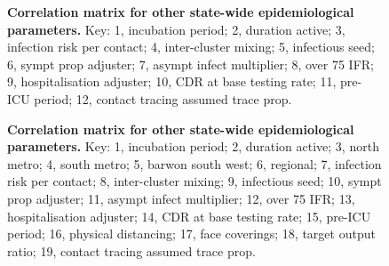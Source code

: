 \begin{figure}[ht]
    \caption{\textbf{Correlation matrix for other state-wide epidemiological parameters.} Key: 1, incubation period; 2, duration active; 3, infection risk per contact; 4, inter-cluster mixing; 5, infectious seed; 6, sympt prop adjuster; 7, asympt infect multiplier; 8, over 75 IFR; 9, hospitalisation adjuster; 10, CDR at base testing rate; 11, pre-ICU period; 12, contact tracing assumed trace prop.}
\end{figure}

\begin{figure}[ht]
    \caption{\textbf{Correlation matrix for other state-wide epidemiological parameters.} Key: 1, incubation period; 2, duration active; 3, north metro; 4, south metro; 5, barwon south west; 6, regional; 7, infection risk per contact; 8, inter-cluster mixing; 9, infectious seed; 10, sympt prop adjuster; 11, asympt infect multiplier; 12, over 75 IFR; 13, hospitalisation adjuster; 14, CDR at base testing rate; 15, pre-ICU period; 16, physical distancing; 17, face coverings; 18, target output ratio; 19, contact tracing assumed trace prop.}
\end{figure}

